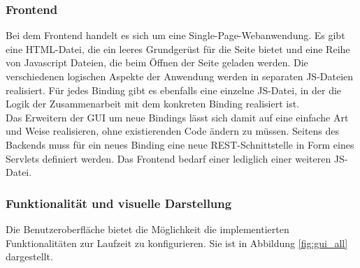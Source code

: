 \subsubsection{Frontend}
Bei dem Frontend handelt es sich um eine Single-Page-Webanwendung. Es gibt eine HTML-Datei, die ein leeres Grundgerüst für die Seite bietet und eine Reihe von Javascript Dateien, die beim Öffnen der Seite geladen werden. Die verschiedenen logischen Aspekte der  Anwendung werden in separaten JS-Dateien realisiert. Für jedes Binding gibt es ebenfalls eine einzelne JS-Datei, in der die Logik der Zusammenarbeit mit dem konkreten Binding realisiert ist. \\

Das Erweitern der GUI um neue Bindings lässt sich damit auf eine einfache Art und Weise realisieren, ohne existierenden Code ändern zu müssen. Seitens des Backends muss für ein neues Binding eine neue REST-Schnittstelle in Form eines Servlets definiert werden. Das Frontend bedarf	einer lediglich einer weiteren JS-Datei.		\\


\subsubsection{Funktionalität und visuelle Darstellung}
Die Benutzeroberfläche bietet die Möglichkeit die implementierten Funktionalitäten zur Laufzeit zu konfigurieren. Sie ist in Abbildung \ref{fig:gui_all} dargestellt. 

